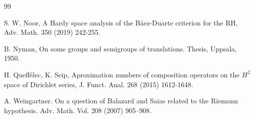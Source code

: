 \documentclass[11pt]{extarticle}
\numberwithin{equation}{section}
\theoremstyle{plain}
\theoremstyle{definition}
\begin{document}
\begin{thebibliography}{99}
	
	
	S. W. Noor, A Hardy space analysis of the Báez-Duarte criterion for the RH, Adv. Math. 350 (2019) 242-255.

      B. Nyman, On some groups and semigroups of translations. Thesis, Uppsala, 1950.

	H. Queffélec, K. Seip, Aproximation numbers of composition operators on the $H^{2}$ space of Dirichlet series, J. Funct. Anal. 268 (2015) 1612-1648.

    A. Weingartner. On a question of Balazard and Saias related to the Riemann hypothesis. Adv. Math. Vol. 208  (2007) 905–908. 
	
	
\end{thebibliography}
\end{document}
